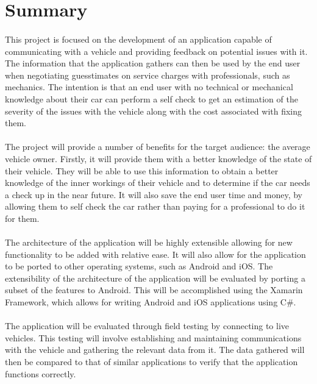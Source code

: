 \section{Summary}
	\paragraph{}{
	This project is focused on the development of an application capable of communicating with a vehicle and providing feedback on potential issues with it. The information that the application gathers can then be used by the end user when negotiating guesstimates on service charges with professionals, such as mechanics. The intention is that an end user with no technical or mechanical knowledge about their car can perform a self check to get an estimation of the severity of the issues with the vehicle along with the cost associated with fixing them.
	}
	\paragraph{}{
	The project will provide a number of benefits for the target audience: the average vehicle owner. Firstly, it will provide them with a better knowledge of the state of their vehicle. They will be able to use this information to obtain a better knowledge of the inner workings of their vehicle and to determine if the car needs a check up in the near future. It will also save the end user time and money, by allowing them to self check the car rather than paying for a professional to do it for them.
	}
	\paragraph{}
	{
	The architecture of the application will be highly extensible allowing for new functionality to be added with relative ease. It will also allow for the application to be ported to other operating systems, such as Android and iOS. The extensibility of the architecture of the application will be evaluated by porting a subset of the features to Android. This will be accomplished using the Xamarin Framework, which allows for writing Android and iOS applications using C{\#}.
	}
	\paragraph{}
	{
	The application will be evaluated through field testing by connecting to live vehicles. This testing will involve establishing and maintaining communications with the vehicle and gathering the relevant data from it. The data gathered will then be compared to that of similar applications to verify that the application functions correctly.
	}
	
